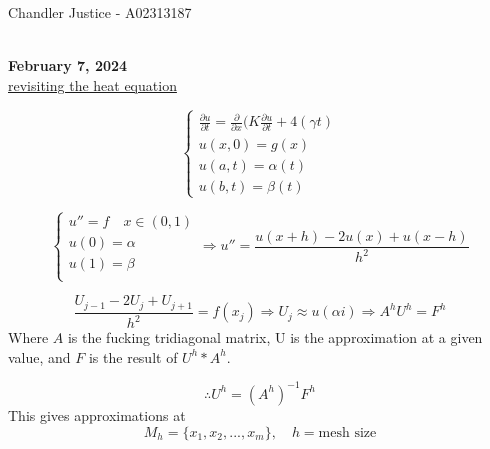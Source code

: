 \documentclass[10pt]{article}
\newcommand{\1}{\mathbb{1}}
\renewcommand{\part}{\partial}
\begin{document}
\begin{flushright}
Chandler Justice - A02313187
\end{flushright}
\noindent \underline{\hspace{3in}}\\

\textbf{February 7, 2024}\\

\underline{revisiting the heat equation}

\[\begin{cases}
\frac{\part u}{\part t} = \frac{\part}{\part x} (K \frac{\part u}{\part t} + 4(\gamma t)\\
u(x, 0) = g(x)\\
u(a, t) = \alpha(t)\\
u(b, t) = \beta(t)
\end{cases}\]

\[\begin{cases}
u'' = f \quad x \in (0,1)\\
u(0) = \alpha\\
u(1) = \beta\\
\end{cases} \Rightarrow
u'' = \frac{u(x+h) -2u(x) + u(x-h)}{h^2}\]

\[\frac{U_{j-1} - 2U_j + U_{j+1}}{h^2} = f(x_j) \Rightarrow U_j \approx u(\alpha i) \Rightarrow A^h U^h = F^h\]
Where $A$ is the fucking tridiagonal matrix, U is the approximation at a given value, and $F$ is the result of $U^h * A^h$.

\[\therefore U^h = (A^h)^{-1} F^h\]
This gives approximations at
\[M_h = \{x_1,x_2,...,x_m\}, \quad h = \text{mesh size}\]
\end{document}
